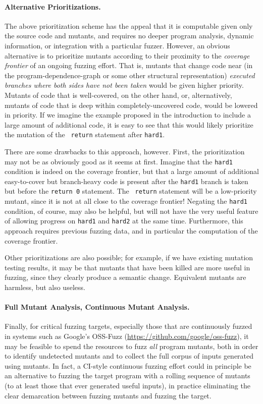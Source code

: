 \paragraph{Alternative Prioritizations.}  The above prioritization scheme has the
appeal that it is computable given only the source code and mutants,
and requires no deeper program analysis, dynamic information, or
integration with a particular fuzzer.  However, an obvious alternative
is to prioritize mutants according to their proximity to the
\emph{coverage frontier} of an ongoing fuzzing effort.  That is,
mutants that change code near (in the program-dependence-graph or some other structural representation)  \emph{executed branches where both sides have not been taken} would be given higher
priority.  Mutants of code that is well-covered, on the other hand, or, alternatively, mutants of
code that is deep within completely-uncovered code,
would be lowered in priority.  If we imagine the example proposed in the
introduction to include a large amount of additional code, it is easy
to see that this would likely prioritize the mutation of the {\tt
  return} statement after {\tt hard1}.

There are some drawbacks to this approach, however.  First, the
prioritization may not be as obviously good as it seems at first.
Imagine that the {\tt hard1} condition is indeed on the coverage
frontier, but that a large amount of additional easy-to-cover but branch-heavy code  is present after
the {\tt hard1} branch is taken but before the {\tt return 0} statement.  The {\tt
  return} statement will be a low-priority mutant, since it is not at
all close to the coverage frontier!  Negating the {\tt hard1}
condition, of course, may also be helpful, but will not have the very
useful feature of allowing progress on {\tt hard1} and {\tt hard2} at
the same time.  Furthermore, this approach requires previous fuzzing
data, and in particular the computation of the coverage frontier.

Other prioritizations are also possible; for example, if we have
existing mutation testing results, it may be that mutants that have
been killed are more useful in fuzzing, since they clearly produce a
semantic change.  Equivalent mutants are harmless, but also useless.

\paragraph{Full Mutant Analysis, Continuous Mutant Analysis.} Finally,
for critical fuzzing targets, especially those
that are continuously fuzzed in systems such as Google's OSS-Fuzz
(\url{https://github.com/google/oss-fuzz}), it may be feasible to
spend the resources to fuzz \emph{all} program mutants, both in order
to identify undetected mutants and to collect the full corpus of
inputs generated using mutants.  In fact, a CI-style continuous
fuzzing effort could in principle be an alternative to fuzzing the target
program with a rolling sequence of mutants (to at least those that ever generated useful
inputs), in practice eliminating the clear demarcation between fuzzing
mutants and fuzzing the target.

